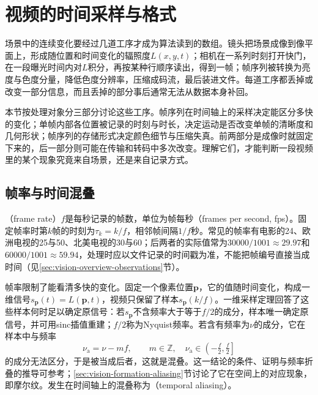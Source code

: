 \section{视频的时间采样与格式}
\label{sec:vision-videofound-sampling}

场景中的连续变化要经过几道工序才成为算法读到的数组。镜头把场景成像到像平面上，形成随位置和时间变化的辐照度$L(x,y,t)$；相机在一系列时刻打开快门，在一段曝光时间内对$L$积分，再按某种行顺序读出，得到一帧；帧序列被转换为亮度与色度分量，降低色度分辨率，压缩成码流，最后装进文件。每道工序都丢掉或改变一部分信息，而且丢掉的部分事后通常无法从数据本身补回。

本节按处理对象分三部分讨论这些工序。帧序列在时间轴上的采样决定能区分多快的变化；单帧内部各位置被记录的时刻与时长，决定运动是否改变单帧的清晰度和几何形状；帧序列的存储形式决定颜色细节与压缩失真。前两部分是成像时就固定下来的，后一部分则可能在传输和转码中多次改变。理解它们，才能判断一段视频里的某个现象究竟来自场景，还是来自记录方式。

\subsection{帧率与时间混叠}
\label{sec:vision-videofound-frame-rate}

（frame rate）$f$是每秒记录的帧数，单位为帧每秒（frames per second, fps）。固定帧率时第$k$帧的时刻为$\tau_k=k/f$，相邻帧间隔$1/f$秒。常见的帧率有电影的24、欧洲电视的25与50、北美电视的30与60；后两者的实际值常为$30000/1001\approx29.97$和$60000/1001\approx59.94$，处理时应以文件记录的时间戳为准，不能把帧编号直接当成时间（见\ref{sec:vision-overview-observations}节）。

帧率限制了能看清多快的变化。固定一个像素位置$\bm{p}$，它的值随时间变化，构成一维信号$s_{\bm p}(t)=L(\bm p,t)$，视频只保留了样本$s_{\bm p}(k/f)$。一维采样定理回答了这些样本何时足以确定原信号：若$s_{\bm p}$不含频率大于等于$f/2$的成分，样本唯一确定原信号，并可用sinc插值重建；$f/2$称为Nyquist频率。若含有频率为$\nu$的成分，它在样本中与频率
\begin{equation}
  \nu_{\mathrm a}=\nu-mf,\qquad m\in\mathbb{Z},\quad
  \nu_{\mathrm a}\in\left(-\tfrac{f}{2},\tfrac{f}{2}\right]
  \label{eq:vision-videofound-alias}
\end{equation}
的成分无法区分，于是被当成后者，这就是混叠。这一结论的条件、证明与频率折叠的推导可参考；\ref{sec:vision-formation-aliasing}节讨论了它在空间上的对应现象，即摩尔纹。发生在时间轴上的混叠称为（temporal aliasing）。

